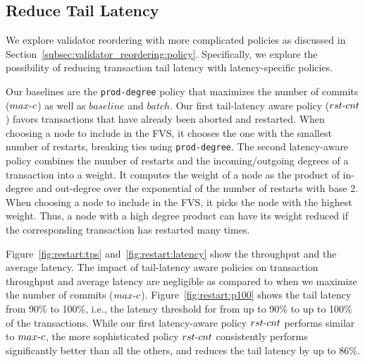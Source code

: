 
\subsection{Reduce Tail Latency}
We explore validator reordering with more complicated policies as discussed in Section~\ref{subsec:validator_reordering:policy}. Specifically, we explore the possibility of reducing transaction tail latency with latency-specific policies.

Our baselines are the \texttt{prod-degree} policy that maximizes the number of commits ($max\hbox{-}c$) as well as $baseline$ and $batch$. 
Our first tail-latency aware policy ($rst\hbox{-}cnt$) favors transactions that have already been aborted and restarted. When choosing a node to include in the FVS, it chooses the one with the smallest number of restarts, breaking ties using \texttt{prod-degree}.
The second latency-aware policy combines the number of restarts and the incoming/outgoing degrees of a transaction into a weight. It computes the weight of a node as
the product of in-degree and out-degree over the exponential of the number of
restarts with base 2. When choosing a node to include in the FVS, it picks the node with the highest weight. Thus, a node with a high degree product can have its weight reduced if the corresponding transaction has restarted many times.

Figure~\ref{fig:restart:tps} and~\ref{fig:restart:latency} show the throughput
and the average latency. The impact of tail-latency aware policies on transaction throughput and average latency are negligible as compared to when we maximize the number of commits ($max\hbox{-}c$).
Figure~\ref{fig:restart:p100} shows the tail latency from 90\% to 100\%, i.e., the latency threshold for from up to 90\% to up to 100\% of the transactions. %
While our first latency-aware policy $rst\hbox{-}cnt$ performs similar to $max\hbox{-}c$, the more sophisticated policy $rst\hbox{-}cnt$ consistently performs significantly better than all the others, and reduces the tail latency by up to 86\%.%

